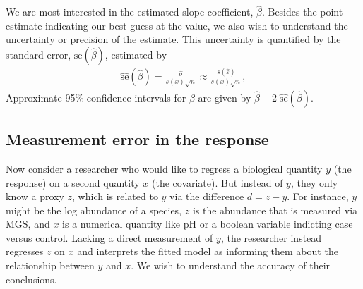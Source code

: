 \documentclass[
]{article}
\begin{document}
We are most interested in the estimated slope coefficient, \(\hat \beta\).
Besides the point estimate indicating our best guess at the value, we also wish to understand the uncertainty or precision of the estimate.
This uncertainty is quantified by the standard error, \(\text{se}(\hat \beta)\), estimated by
\begin{align}
  \label{eq:lm-se}
  \hat{\text{se}}(\hat \beta)
  = \frac{\hat \sigma}{s(x) \sqrt{n}}
  \approx \frac{s(\hat \varepsilon)}{s(x) \sqrt{n}},
\end{align}
Approximate 95\% confidence intervals for \(\beta\) are given by \(\hat \beta \pm 2\; \hat{\text{se}}(\hat \beta)\).

\hypertarget{measurement-error-in-the-response}{%
\subsection{Measurement error in the response}\label{measurement-error-in-the-response}}

Now consider a researcher who would like to regress a biological quantity \(y\) (the response) on a second quantity \(x\) (the covariate).
But instead of \(y\), they only know a proxy \(z\), which is related to \(y\) via the difference \(d = z - y\).
For instance, \(y\) might be the log abundance of a species, \(z\) is the abundance that is measured via MGS, and \(x\) is a numerical quantity like pH or a boolean variable indicting case versus control.
Lacking a direct measurement of \(y\), the researcher instead regresses \(z\) on \(x\) and interprets the fitted model as informing them about the relationship between \(y\) and \(x\).
We wish to understand the accuracy of their conclusions.
\end{document}
